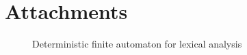 \documentclass[a4paper, 11pt]{article}
\begin{document}
\section{Attachments}
\begin{figure}[ht]
    \begin{center}
        \caption{Deterministic finite automaton for lexical analysis}
        \label{automaton}
    \end{center}
\end{figure}
\end{document}
